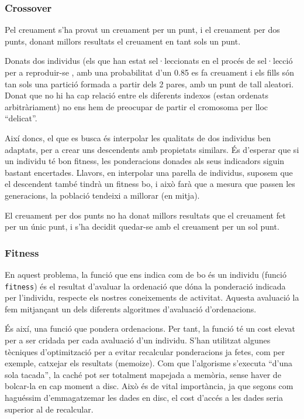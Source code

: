 \subsubsection{Crossover} %
\label{ssub:Crossover}

Pel creuament s'ha provat un creuament per un punt, i el creuament per dos
punts, donant millors resultats el creuament en tant sols un punt.  

Donats dos individus (els que han estat sel·leccionats en el procés de
sel·lecció per a reproduir-se , amb una probabilitat d'un 0.85 es fa creuament i
els fills són tan sols una partició formada a partir dels 2 pares, amb un punt
de tall aleatori.  Donat que no hi ha cap relació entre els diferents indexos
(estan ordenats arbitràriament) no ens hem de preocupar de partir el cromosoma
per lloc ``delicat''. 

Així doncs, el que es busca és interpolar les qualitats de dos individus ben
adaptats, per a crear uns descendents amb propietats similars.  És d'esperar que
si un individu té bon fitness, les ponderacions donades als seus indicadors
siguin bastant encertades.  Llavors, en interpolar una parella de individus,
suposem que el descendent també tindrà un fitness bo, i això farà que a mesura
que passen les generacions, la població tendeixi a millorar (en mitja).

El creuament per dos punts no ha donat millors resultats que el creuament fet
per un únic punt, i s'ha decidit quedar-se amb el creuament per un sol punt.

\subsubsection{Fitness} %
\label{ssub:PFitness}
En aquest problema, la funció que ens indica com de bo és un individu (funció
\texttt{fitness}) és el resultat d'avaluar la ordenació que dóna la ponderació
indicada per l'individu, respecte els nostres coneixements de activitat. Aquesta
avaluació la fem mitjançant un dels diferents algoritmes d'avaluació d'ordenacions.


És així, una funció que pondera ordenacions.  Per tant, la funció té un cost
elevat per a ser cridada per cada avaluació d'un individu.  S'han utilitzat
algunes tècniques d'optimització per a evitar recalcular ponderacions ja fetes,
com per exemple, catxejar els resultats (memoize).  Com que l'algorisme
s'executa ``d'una sola tacada'', la caché pot ser totalment mapejada a memòria,
sense haver de bolcar-la en cap moment a disc.  Això és de vital importància, ja
que segons com haguéssim d'emmagatzemar les dades en disc, el cost d'accés a les
dades seria superior al de recalcular. 

